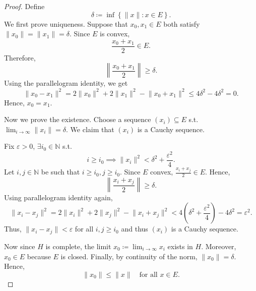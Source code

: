 \begin{proof}
    Define 
    \[
        \delta \coloneqq \inf \left\{ \lVert x \rVert: x \in E  \right\}. 
    \]
    We first prove uniqueness. Suppose that \(x_0, x_1 \in E\) both satisfy \(\lVert x_0 \rVert = \lVert x_1 \rVert = \delta  \). Since \(E\) is convex, 
    \[
        \frac{x_0 + x_1}{2} \in E.
    \] 
    Therefore,
    \[
        \left\lVert \frac{x_0 + x_1}{2} \right\rVert \ge \delta. 
    \]
    Using the parallelogram identity, we get 
    \[
        \lVert x_0 - x_1 \rVert^2 = 2 \lVert x_0 \rVert^2 + 2 \lVert x_1 \rVert^2 - \lVert x_0 + x_1 \rVert^2 \le 4 \delta ^2 - 4 \delta ^2 = 0.    
    \]
    Hence, \(x_0 = x_1\). 

    Now we prove the existence. Choose a sequence \((x_i) \subseteq E\) s.t. \(\lim_{i \to \infty} \lVert x_i \rVert = \delta  \). We claim that \((x_i)\) is a Cauchy sequence. 

    Fix \(\varepsilon > 0\), \(\exists i_0 \in \mathbb{N}\) s.t. 
    \[
        i \ge i_0 \implies \lVert x_i \rVert^2 < \delta ^2 + \frac{\varepsilon^2}{4}. 
    \]      
    Let \(i, j \in \mathbb{N}\) be such that \(i \ge i_0, j \ge i_0\). Since \(E\) convex, \(\frac{x_i + x_j}{2} \in E\). Hence,
    \[
        \left\lVert \frac{x_i + x_j}{2} \right\rVert \ge \delta. 
    \]    
    Using parallelogram identity again,
    \[
        \lVert x_i - x_j \rVert^2 = 2 \lVert x_i \rVert^2 + 2 \lVert x_j \rVert^2 - \lVert x_i + x_j \rVert^2 < 4 \left( \delta ^2 + \frac{\varepsilon^2}{4} \right) - 4 \delta ^2 = \varepsilon ^2.     
    \]
    Thus, \(\lVert x_i - x_j \rVert < \varepsilon\) for all \(i, j \ge i_0\) and thus \((x_i)\) is a Cauchy sequence. 

    Now since \(H\) is complete, the limit \(x_0 \coloneqq \lim_{i \to \infty} x_i \) exists in \(H\). Moreover, \(x_0 \in E\) because \(E\) is closed. Finally, by continuity of the norm,  \(\lVert x_0 \rVert = \delta \). Hence,
    \[
        \lVert x_0 \rVert \le \lVert x \rVert \quad \text{for all } x \in E.   
    \]         
\end{proof}